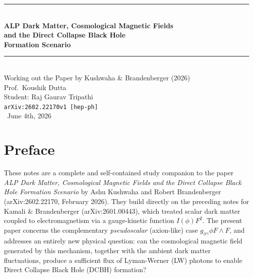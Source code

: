 \documentclass[12pt,a4paper]{report}
\newcommand{\gag}{g_{\phi\gamma}}
\theoremstyle{definition}
\begin{document}
\begin{titlepage}
\centering
\vspace*{2cm}
{\rule{\linewidth}{2pt}}\\[0.5cm]
{\LARGE\bfseries ALP Dark Matter, Cosmological Magnetic Fields}\\[0.4cm]
{\LARGE\bfseries and the Direct Collapse Black Hole}\\[0.4cm]
{\LARGE\bfseries Formation Scenario}\\[0.5cm]
{\rule{\linewidth}{2pt}}\\[2cm]

{\large Working out the Paper by Kushwaha \& Brandenberger (2026)}\\[1cm]
Prof.\ Koushik Dutta\\[0.2cm]
Student: Raj Gaurav Tripathi\\[0.2cm]

\texttt{arXiv:2602.22170v1 [hep-ph]}\\[2cm]
{\ June 4th, 2026}
\vfill
\end{titlepage}

\tableofcontents
\newpage

\chapter*{Preface}

These notes are a complete and self-contained study companion to the paper
\emph{ALP Dark Matter, Cosmological Magnetic Fields and the Direct Collapse Black Hole
Formation Scenario} by Ashu Kushwaha and Robert Brandenberger
(arXiv:2602.22170, February 2026). They build directly on the preceding notes for
Kamali \& Brandenberger (arXiv:2601.00443), which treated scalar dark matter coupled
to electromagnetism via a gauge-kinetic function $I(\phi)F^2$. The present paper
concerns the complementary \emph{pseudoscalar} (axion-like) case $\gag\phi F\wedge F$,
and addresses an entirely new physical question: can the cosmological magnetic field
generated by this mechanism, together with the ambient dark matter fluctuations, produce
a sufficient flux of Lyman-Werner (LW) photons to enable Direct Collapse Black Hole
(DCBH) formation?
\end{document}
